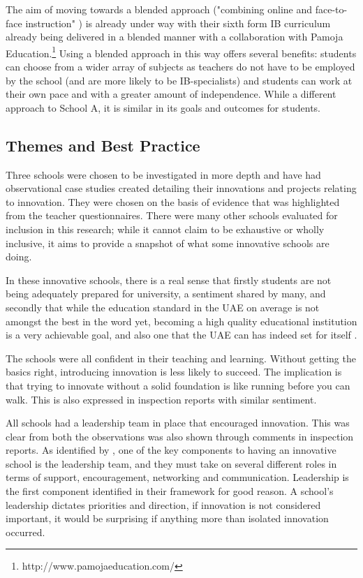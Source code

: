 \documentclass[11pt]{article}
\begin{document}
The aim of moving towards a blended approach ("combining online and face-to-face instruction" \citep{bonk2006handbook}) is already under way with their sixth form IB curriculum already being delivered in a blended manner with a collaboration with Pamoja Education.\footnote{http://www.pamojaeducation.com/} Using a blended approach in this way offers several benefits: students can choose from a wider array of subjects as teachers do not have to be employed by the school (and are more likely to be IB-specialists) and students can work at their own pace and with a greater amount of independence. While a different approach to School A, it is similar in its goals and outcomes for students.

\subsection{Themes and Best Practice}
Three schools were chosen to be investigated in more depth and have had observational case studies created detailing their innovations and projects relating to innovation. They were chosen on the basis of evidence that was highlighted from the teacher questionnaires. There were many other schools evaluated for inclusion in this research; while it cannot claim to be exhaustive or wholly inclusive, it aims to provide a snapshot of what some innovative schools are doing. 

In these innovative schools, there is a real sense that firstly students are not being adequately prepared for university, a sentiment shared by many, \citep{Ali2016,Moussly2012} and secondly that while the education standard in the UAE on average is not amongst the best in the word yet, \citep{2013} becoming a high quality educational institution is a very achievable goal, and also one that the UAE can has indeed set for itself \citep{UAEGovernment2012}.

The schools were all confident in their teaching and learning. Without getting the basics right, introducing innovation is less likely to succeed. The implication is that trying to innovate without a solid foundation is like running before you can walk. This is also expressed in inspection reports with similar sentiment. 

All schools had a leadership team in place that encouraged innovation. This was clear from both the observations was also shown through comments in inspection reports. As identified by \citet{Sharma_2005}, one of the key components to having an innovative school is the leadership team, and they must take on several different roles in terms of support, encouragement, networking and communication. Leadership is the first component identified in their framework for good reason. A school's leadership dictates priorities and direction, if innovation is not considered important, it would be surprising if anything more than isolated innovation occurred.
\end{document}
